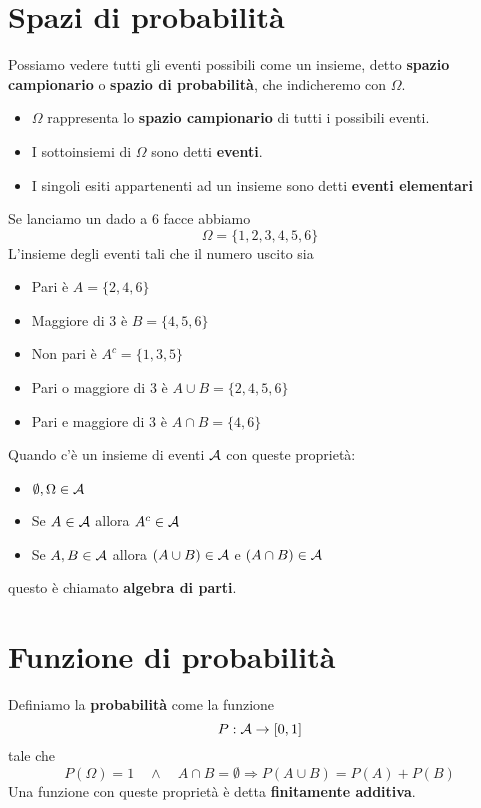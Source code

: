 \section{Spazi di probabilità}
Possiamo vedere tutti gli eventi possibili come un insieme, detto \textbf{spazio campionario} o
\textbf{spazio di probabilità}, che indicheremo con $\Omega$.
\begin{itemize}
	\item $\Omega$ rappresenta lo \textbf{spazio campionario} di tutti i possibili eventi.
	\item I sottoinsiemi di $\Omega$ sono detti \textbf{eventi}.
	\item I singoli esiti appartenenti ad un insieme sono detti \textbf{eventi elementari}
\end{itemize}

\begin{example}
	Se lanciamo un dado a 6 facce abbiamo
	\[ \Omega = \{ 1, 2, 3, 4, 5, 6 \} \]
	L'insieme degli eventi tali che il numero uscito sia
	\begin{itemize}
		\item Pari è $A = \{ 2, 4, 6 \}$
		\item Maggiore di 3 è $B = \{ 4, 5, 6 \}$
		\item Non pari è $A^c = \{ 1, 3, 5 \}$
		\item Pari o maggiore di 3 è $A \cup B = \{ 2, 4, 5, 6 \}$
		\item Pari e maggiore di 3 è $A \cap B = \{ 4, 6 \}$
	\end{itemize}
\end{example}

\begin{definition}
	Quando c'è un insieme di eventi $\mathcal{A}$ con queste proprietà:
	\begin{itemize}
		\item $\emptyset, \Omega \in \mathcal{A}$
		\item Se $A \in \mathcal{A}$ allora $A^c \in \mathcal{A}$
		\item Se $A, B \in \mathcal{A}$ allora $(A \cup B) \in \mathcal{A}$ e $(A \cap B) \in \mathcal{A}$
	\end{itemize}
	questo è chiamato \textbf{algebra di parti}.
\end{definition}

\section{Funzione di probabilità}
\begin{definition}[Provvisoria]
	Definiamo la \textbf{probabilità} come la funzione
	\[ P : \mathcal{A} \to [0, 1] \]
	tale che
	\[
		P (\Omega) = 1 \quad \land \quad
		A \cap B = \emptyset \Rightarrow P(A \cup B) = P(A) + P(B)
	\]
	Una funzione con queste proprietà è detta \textbf{finitamente additiva}.
\end{definition}

